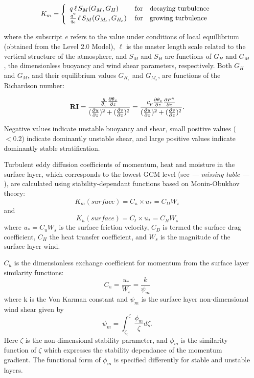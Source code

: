 \[
K_m
 = \left\{ \begin{array}{l@{\quad\mbox{for}\quad}l} q \, \ell \, S_M(G_M,G_H) \, & \mbox{decaying turbulence}                
\\ \frac{ q^2 }{ q_e } \, \ell \, S_{M}(G_{M_e},G_{H_e}) \, & \mbox{growing turbulence} \end{array} \right.
\]

where the subscript $e$ refers to the value under conditions of local equillibrium
(obtained from the Level 2.0 Model), $\ell$ is the master length scale related to the 
vertical structure of the atmosphere,
and $S_M$ and $S_H$ are functions of $G_H$ and $G_M$, the dimensionless buoyancy and
wind shear parameters, respectively.
Both $G_H$ and $G_M$, and their equilibrium values $G_{H_e}$ and $G_{M_e}$,
are functions of the Richardson number:

\[
{\bf RI} = \frac{ \frac{g}{\theta_v} \frac{\partial \theta_v}{\partial z} }{ (\frac{\partial u}{\partial z})^2 + (\frac{\partial v}{\partial z})^2 }
 =  \frac{c_p \frac{\partial \theta_v}{\partial z} \frac{\partial P^ \kappa}{\partial z} }{ (\frac{\partial u}{\partial z})^2 + (\frac{\partial v}{\partial z})^2 } .
\]

Negative values indicate unstable buoyancy and shear, small positive values ($<0.2$)
indicate dominantly unstable shear, and large positive values indicate dominantly stable
stratification.

Turbulent eddy diffusion coefficients of momentum, heat and moisture in the 
surface layer, which corresponds to the lowest GCM level 
(see {\it --- missing table ---}%
), 
are calculated using stability-dependant functions based on Monin-Obukhov theory:
\[
{K_m} (surface) = C_u \times u_* = C_D W_s
\]
and
\[
{K_h} (surface) =  C_t \times u_* = C_H W_s
\]
where $u_*=C_uW_s$ is the surface friction velocity,
$C_D$ is termed the surface drag coefficient, $C_H$ the heat transfer coefficient, 
and $W_s$ is the magnitude of the surface layer wind.

$C_u$ is the dimensionless exchange coefficient for momentum from the surface layer
similarity functions: 
\[
{C_u} = \frac{u_* }{ W_s} = \frac{ k }{ \psi_{m} }
\]
where k is the Von Karman constant and $\psi_m$ is the surface layer non-dimensional 
wind shear given by
\[
\psi_{m} = {\int_{\zeta_{0}}^{\zeta} \frac{\phi_{m} }{ \zeta} d \zeta} .
\]
Here $\zeta$ is the non-dimensional stability parameter, and
$\phi_m$ is the similarity function of $\zeta$ which expresses the stability dependance of
the momentum gradient.  The functional form of $\phi_m$ is specified differently for stable and unstable 
layers.

